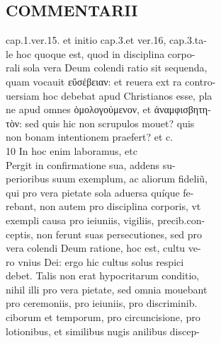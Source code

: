 \documentclass{article}
\begin{document}
\begin{pages}
\section*{COMMENTARII \\
                }cap.1.ver.15. et initio cap.3.et ver.16, cap.3.ta- \\
                le hoc quoque est, quod in disciplina corpo- \\
                rali sola vera Deum colendi ratio sit sequenda, \\
                quam vocauit εὔσέβειαν: et reuera ext ra contro- \\
                uersiam hoc debebat apud Christianos esse, pla \\
                ne apud omnes ὁμολογούμενον, et ἀναμφισβητη- \\
                τὸν: sed quis hic non scrupulos mouet? quis \\
                non bonam intentionem praefert? et c. \\
                10 In hoc enim laboramus, etc \\
                Pergit in confirmatione sua, addens su- \\
                perioribus suum exemplum, ac aliorum fideliũ, \\
                qui pro vera pietate sola aduersa quíque fe- \\
                rebant, non autem pro disciplina corporis, vt \\
                exempli causa pro ieiuniis, vigiliis, precib.con- \\
                ceptis, non ferunt suas persecutiones, sed pro \\
                vera colendi Deum ratione, hoc est, cultu ve- \\
                ro vnius Dei: ergo hic cultus solus respici \\
                debet. Talis non erat hypocritarum conditio, \\
                nihil illi pro vera pietate, sed omnia mouebant \\
                pro ceremoniis, pro ieiuniis, pro discriminib. \\
                ciborum et temporum, pro circuncisione, pro \\
                lotionibus, et similibus nugis anilibus discep- \\

\end{pages}
\end{document}
